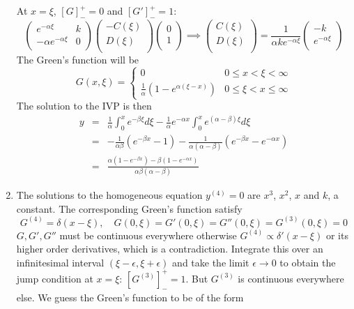 \documentclass[a4paper]{article}
\begin{document}
\begin{ans}
\begin{enumerate}[label=(\alph*)]
At $x=\xi$, $[G]_-^+=0$ and $[G']_-^+=1$: 
$$\begin{pmatrix}e^{-\alpha\xi}&k\\-\alpha e^{-\alpha\xi}&0\\\end{pmatrix}\begin{pmatrix}-C(\xi)\\D(\xi)\\\end{pmatrix}\begin{pmatrix}0\\1\\\end{pmatrix}\implies\begin{pmatrix}C(\xi)\\D(\xi)\\\end{pmatrix}=\frac{1}{\alpha ke^{-\alpha\xi}}\begin{pmatrix}-k\\e^{-\alpha\xi}\\\end{pmatrix}$$
The Green's function will be
$$G(x,\xi)=
\left\{
        \begin{array}{ll}
      0 & 0\leq x<\xi<\infty \\
      \frac{1}{\alpha}(1-e^{\alpha(\xi-x)}) & 0\leq\xi< x\leq \infty
        \end{array}
    \right.$$
The solution to the IVP is then
\begin{eqnarray}
y&=&\frac{1}{\alpha}\int_0^xe^{-\beta\xi}d\xi-\frac{1}{\alpha}e^{-\alpha x}\int_0^xe^{(\alpha-\beta)\xi}d\xi\nonumber\\&=&-\frac{1}{\alpha\beta}(e^{-\beta x}-1)-\frac{1}{\alpha(\alpha-\beta)}(e^{-\beta x}-e^{-\alpha x})\nonumber\\&=&\frac{\alpha(1-e^{-\beta x})-\beta(1-e^{-\alpha x})}{\alpha\beta(\alpha-\beta)}\nonumber
\end{eqnarray}
\item The solutions to the homogeneous equation $y^{(4)}=0$ are $x^3$, $x^2$, $x$ and $k$, a constant. The corresponding Green's function satisfy $$G^{(4)}=\delta(x-\xi),\quad G(0,\xi)=G'(0,\xi)=G''(0,\xi)=G^{(3)}(0,\xi)=0$$
$G,G',G''$ must be continuous everywhere otherwise $G^{(4)}\propto\delta'(x-\xi)$ or its higher order derivatives, which is a contradiction. Integrate this over an infinitesimal interval $(\xi-\epsilon,\xi+\epsilon)$ and take the limit $\epsilon\rightarrow 0$ to obtain the jump condition at $x=\xi$: $[G^{(3)}]_-^+=1$. But $G^{(3)}$ is continuous everywhere else. We guess the Green's function to be of the form

\end{enumerate}
\end{ans}
\end{document}
